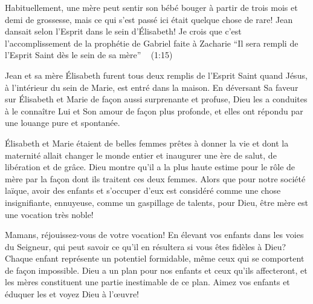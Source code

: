 


Habituellement, une mère peut sentir son bébé bouger à partir de trois mois et demi de grossesse, mais ce qui s'est passé ici était quelque chose de rare! Jean dansait selon l'Esprit dans le sein d'Élisabeth! Je crois que c'est l'accomplissement de la prophétie de Gabriel faite à Zacharie “Il sera rempli de l’Esprit Saint dès le sein de sa mère”
                                                                         ~ (1:15)

Jean et sa mère Élisabeth furent tous deux remplis de l'Esprit Saint quand Jésus, à l'intérieur du sein de Marie, est entré dans la maison. En déversant Sa faveur sur Élisabeth et Marie de façon aussi surprenante et profuse, Dieu les a conduites à le connaître Lui et Son amour de façon plus profonde, et elles ont répondu par une louange pure et spontanée.

Élisabeth et Marie étaient de belles femmes prêtes à donner la vie et dont la maternité allait changer le monde entier et inaugurer une ère de salut, de libération et de grâce. Dieu montre qu'il a la plus haute estime pour le rôle de mère par la façon dont ils traitent ces deux femmes. Alors que pour notre société laïque, avoir des enfants et s'occuper d'eux est considéré comme une chose insignifiante, ennuyeuse, comme un gaspillage de talents, pour Dieu, être mère est une vocation très noble!

Mamans, réjouissez-vous de votre vocation! En élevant vos enfants dans les voies du Seigneur, qui peut savoir ce qu'il en résultera si vous êtes fidèles à Dieu? Chaque enfant représente un potentiel formidable, même ceux qui se comportent de façon impossible. Dieu a un plan pour nos enfants et ceux qu'ils affecteront, et les mères constituent une partie inestimable de ce plan. Aimez vos enfants et éduquer les et voyez Dieu à l'œuvre!


